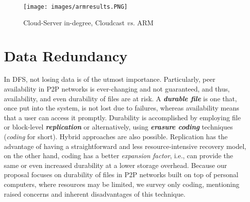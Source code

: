 \documentclass[runningheads]{llncs}
\begin{document}
\begin{figure}[!ht]
\centering
\texttt{[image: images/armresults.PNG]}
\caption{Cloud-Server in-degree, Cloudcast \textit{vs.} ARM}
\label{fig:arm_results}
\end{figure}

\section{Data Redundancy}\label{sec:dataredundancy}
In DFS, not losing data is of the utmost importance. Particularly, peer availability in P2P networks is ever-changing and not guaranteed, and thus, availability, and even durability of files are at risk. A \textbf{\textit{durable file}} is one that, once put into the system, is not lost due to failures, whereas availability means that a user can access it promptly. Durability is accomplished by employing file or block-level \textbf{\textit{replication}} or alternatively, using \textbf{\textit{erasure coding}} techniques (\textit{coding} for short). Hybrid approaches are also possible. Replication has the advantage of having a straightforward and less resource-intensive recovery model, on the other hand, coding has a better \textit{expansion factor}, i.e., can provide the same or even increased durability at a lower storage overhead. Because our proposal focuses on durability of files in P2P networks built on top of personal computers, where resources may be limited, we survey only coding, mentioning raised concerns and inherent disadvantages of this technique.
\end{document}
